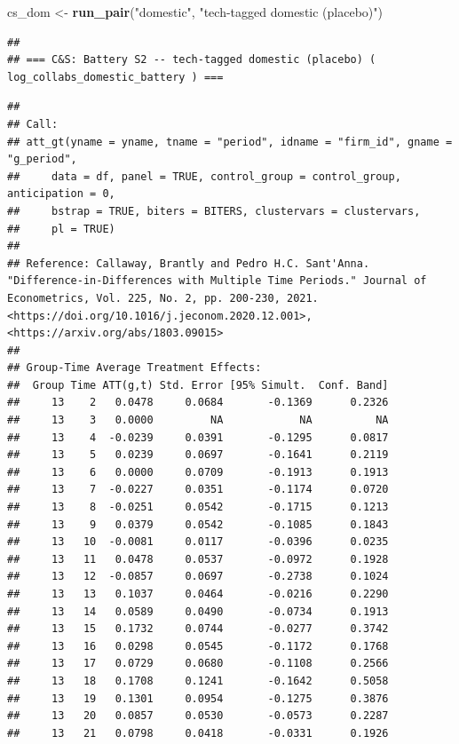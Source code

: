 \documentclass[
]{article}
\newenvironment{Shaded}{\begin{snugshade}}{\end{snugshade}}
\newcommand{\FunctionTok}[1]{\textcolor[rgb]{0.13,0.29,0.53}{\textbf{#1}}}
\newcommand{\NormalTok}[1]{#1}
\newcommand{\OtherTok}[1]{\textcolor[rgb]{0.56,0.35,0.01}{#1}}
\newcommand{\StringTok}[1]{\textcolor[rgb]{0.31,0.60,0.02}{#1}}
\begin{document}
\begin{Shaded}
\begin{Highlighting}[]
\NormalTok{cs\_dom  }\OtherTok{\textless{}{-}} \FunctionTok{run\_pair}\NormalTok{(}\StringTok{"domestic"}\NormalTok{,     }\StringTok{"tech{-}tagged domestic (placebo)"}\NormalTok{)}
\end{Highlighting}
\end{Shaded}

\begin{verbatim}
## 
## === C&S: Battery S2 -- tech-tagged domestic (placebo) ( log_collabs_domestic_battery ) ===
\end{verbatim}

\begin{verbatim}
## 
## Call:
## att_gt(yname = yname, tname = "period", idname = "firm_id", gname = "g_period", 
##     data = df, panel = TRUE, control_group = control_group, anticipation = 0, 
##     bstrap = TRUE, biters = BITERS, clustervars = clustervars, 
##     pl = TRUE)
## 
## Reference: Callaway, Brantly and Pedro H.C. Sant'Anna.  "Difference-in-Differences with Multiple Time Periods." Journal of Econometrics, Vol. 225, No. 2, pp. 200-230, 2021. <https://doi.org/10.1016/j.jeconom.2020.12.001>, <https://arxiv.org/abs/1803.09015> 
## 
## Group-Time Average Treatment Effects:
##  Group Time ATT(g,t) Std. Error [95% Simult.  Conf. Band]  
##     13    2   0.0478     0.0684       -0.1369      0.2326  
##     13    3   0.0000         NA            NA          NA  
##     13    4  -0.0239     0.0391       -0.1295      0.0817  
##     13    5   0.0239     0.0697       -0.1641      0.2119  
##     13    6   0.0000     0.0709       -0.1913      0.1913  
##     13    7  -0.0227     0.0351       -0.1174      0.0720  
##     13    8  -0.0251     0.0542       -0.1715      0.1213  
##     13    9   0.0379     0.0542       -0.1085      0.1843  
##     13   10  -0.0081     0.0117       -0.0396      0.0235  
##     13   11   0.0478     0.0537       -0.0972      0.1928  
##     13   12  -0.0857     0.0697       -0.2738      0.1024  
##     13   13   0.1037     0.0464       -0.0216      0.2290  
##     13   14   0.0589     0.0490       -0.0734      0.1913  
##     13   15   0.1732     0.0744       -0.0277      0.3742  
##     13   16   0.0298     0.0545       -0.1172      0.1768  
##     13   17   0.0729     0.0680       -0.1108      0.2566  
##     13   18   0.1708     0.1241       -0.1642      0.5058  
##     13   19   0.1301     0.0954       -0.1275      0.3876  
##     13   20   0.0857     0.0530       -0.0573      0.2287  
##     13   21   0.0798     0.0418       -0.0331      0.1926  

\end{verbatim}
\end{document}
